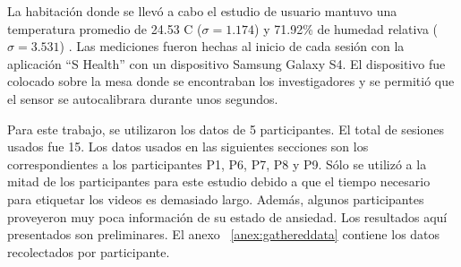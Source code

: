 La habitaci\'on donde se llev\'o a cabo el estudio de usuario mantuvo una temperatura promedio de 24.53 \textdegree  C ($\sigma= 1.174$) y 71.92\% de humedad relativa ($\sigma= 3.531$) . Las mediciones fueron hechas al inicio de cada sesi\'on con la aplicaci\'on ``S Health'' con un dispositivo Samsung Galaxy S4. El dispositivo fue colocado sobre la mesa donde se encontraban los investigadores y se permiti\'o que el sensor se autocalibrara durante unos segundos. 

Para este trabajo, se utilizaron los datos de 5 participantes. El total de sesiones usados fue 15. Los datos usados en las siguientes secciones son los correspondientes a los participantes P1, P6, P7, P8 y P9. S\'olo se utiliz\'o a la mitad de los participantes para este estudio debido a que el tiempo necesario para etiquetar los videos es demasiado largo. Adem\'as, algunos participantes proveyeron muy poca informaci\'on de su estado de ansiedad. Los resultados aqu\'i presentados son preliminares. El anexo ~\ref{anex:gathereddata} contiene los datos recolectados por participante.
